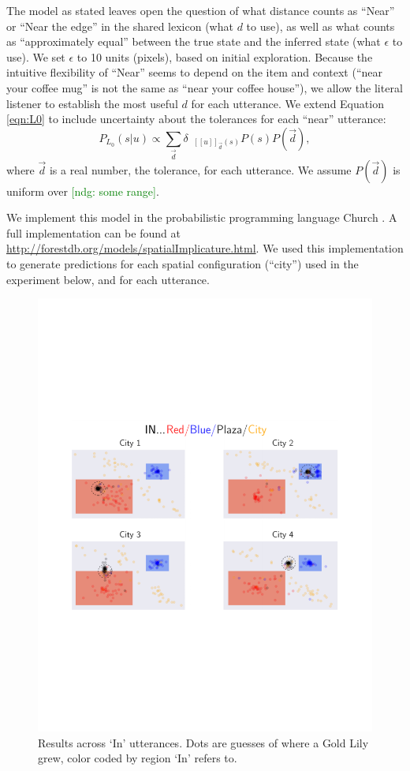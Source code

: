 \documentclass[10pt,letterpaper]{article}
\newcommand{\denote}[1]{\mbox{ $[\![ #1 ]\!]$}}
\newcommand{\ndg}[1]{\textcolor{Green}{[ndg: #1]}}
\begin{document}
The model as stated leaves open the question of what distance counts as ``Near'' or ``Near the edge'' in the shared lexicon (what $d$ to use), as well as what counts as ``approximately equal'' between the true state and the inferred state (what $\epsilon$ to use). We set $\epsilon$ to 10 units (pixels), based on initial exploration. 
Because the intuitive flexibility of ``Near'' seems to depend on the item and context (``near your coffee mug'' is not the same as ``near your coffee house''), we allow the literal listener to establish the most useful $d$ for each utterance.
We extend Equation \ref{eqn:L0} to include uncertainty about the tolerances for each ``near'' utterance:
\begin{equation}
P_{L_0}(s|u)\propto \sum_{\vec{d}} \delta_{\denote{u}_{\vec{d}}(s)} P(s) P(\vec{d})\label{eqn:L0tol},
\end{equation}
where $\vec{d}$ is a real number, the tolerance, for each utterance. We assume $P(\vec{d})$ is uniform over \ndg{some range}.

We implement this model in the probabilistic programming language Church \cite{goodman2008}. A full implementation can be found at \url{http://forestdb.org/models/spatialImplicature.html}. We used this implementation to generate predictions for each spatial configuration (``city'') used in the experiment below, and for each utterance.


\begin{figure}[!t]
\center
\includegraphics[width=.82\textwidth]{figures/In.pdf}
\caption{Results across `In' utterances. Dots are guesses of where a Gold Lily grew, color coded by region `In' refers to.}
\label{fig:In}
\end{figure}
\end{document}
